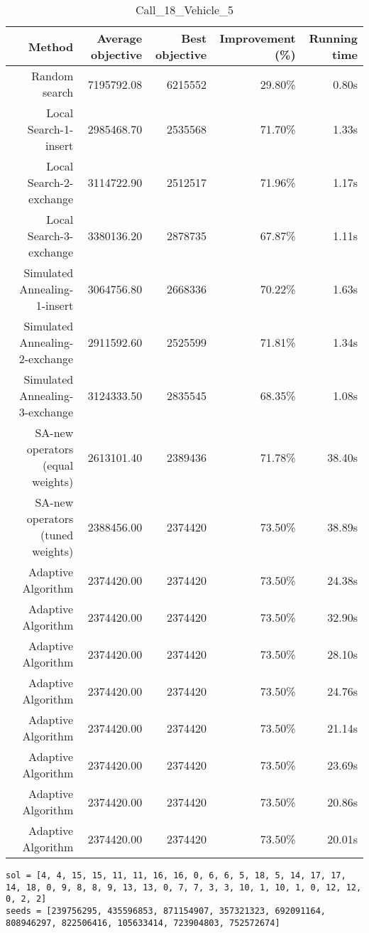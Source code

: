 \begin{table}[ht]
\centering
\caption{Call\_18\_Vehicle\_5}
\label{tab:call18vehicle5}
\begin{tabular}{|r|r|r|r|r|}
Method & Average objective & Best objective & Improvement (\%) & Running time \\
\hline
Random search & 7195792.08 & 6215552 & 29.80\% & 0.80s\\
Local Search-1-insert & 2985468.70 & 2535568 & 71.70\% & 1.33s\\
Local Search-2-exchange & 3114722.90 & 2512517 & 71.96\% & 1.17s\\
Local Search-3-exchange & 3380136.20 & 2878735 & 67.87\% & 1.11s\\
Simulated Annealing-1-insert & 3064756.80 & 2668336 & 70.22\% & 1.63s\\
Simulated Annealing-2-exchange & 2911592.60 & 2525599 & 71.81\% & 1.34s\\
Simulated Annealing-3-exchange & 3124333.50 & 2835545 & 68.35\% & 1.08s\\
SA-new operators (equal weights) & 2613101.40 & 2389436 & 71.78\% & 38.40s\\
SA-new operators (tuned weights) & 2388456.00 & 2374420 & 73.50\% & 38.89s\\
Adaptive Algorithm & 2374420.00 & 2374420 & 73.50\% & 24.38s\\
Adaptive Algorithm & 2374420.00 & 2374420 & 73.50\% & 32.90s\\
Adaptive Algorithm & 2374420.00 & 2374420 & 73.50\% & 28.10s\\
Adaptive Algorithm & 2374420.00 & 2374420 & 73.50\% & 24.76s\\
Adaptive Algorithm & 2374420.00 & 2374420 & 73.50\% & 21.14s\\
Adaptive Algorithm & 2374420.00 & 2374420 & 73.50\% & 23.69s\\
Adaptive Algorithm & 2374420.00 & 2374420 & 73.50\% & 20.86s\\
Adaptive Algorithm & 2374420.00 & 2374420 & 73.50\% & 20.01s\\
\end{tabular}%
\end{table}
\begin{lstlisting}[label={lst:call18vehicle5},caption=Optimal solution call\_18\_vehicle\_5]
sol = [4, 4, 15, 15, 11, 11, 16, 16, 0, 6, 6, 5, 18, 5, 14, 17, 17, 14, 18, 0, 9, 8, 8, 9, 13, 13, 0, 7, 7, 3, 3, 10, 1, 10, 1, 0, 12, 12, 0, 2, 2]
seeds = [239756295, 435596853, 871154907, 357321323, 692091164, 808946297, 822506416, 105633414, 723904803, 752572674]
\end{lstlisting}%
\clearpage


